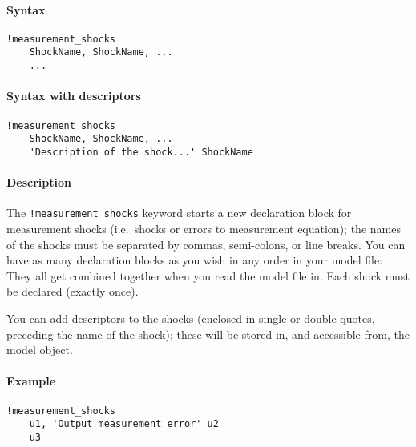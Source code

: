 


	\paragraph{Syntax}

\begin{verbatim}
!measurement_shocks
    ShockName, ShockName, ...
    ...
\end{verbatim}

\paragraph{Syntax with descriptors}

\begin{verbatim}
!measurement_shocks
    ShockName, ShockName, ...
    'Description of the shock...' ShockName
\end{verbatim}

\paragraph{Description}

The \texttt{!measurement\_shocks} keyword starts a new declaration block
for measurement shocks (i.e.~shocks or errors to measurement equation);
the names of the shocks must be separated by commas, semi-colons, or
line breaks. You can have as many declaration blocks as you wish in any
order in your model file: They all get combined together when you read
the model file in. Each shock must be declared (exactly once).

You can add descriptors to the shocks (enclosed in single or double
quotes, preceding the name of the shock); these will be stored in, and
accessible from, the model object.

\paragraph{Example}

\begin{verbatim}
!measurement_shocks
    u1, 'Output measurement error' u2
    u3
\end{verbatim}


